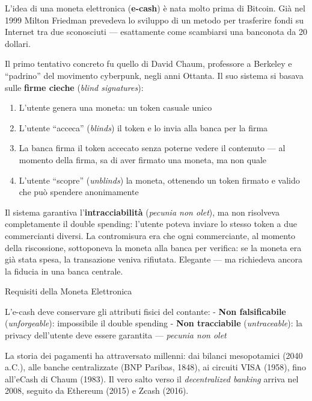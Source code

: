 \documentclass[
  italian,
  openany]{book}
\providecommand{\tightlist}{%
  \setlength{\itemsep}{0pt}\setlength{\parskip}{0pt}}
\begin{document}
L'idea di una moneta elettronica (\textbf{e-cash}) è nata molto prima di
Bitcoin. Già nel 1999 Milton Friedman prevedeva lo sviluppo di un metodo
per trasferire fondi su Internet tra due sconosciuti --- esattamente
come scambiarsi una banconota da 20 dollari.

Il primo tentativo concreto fu quello di David Chaum, professore a
Berkeley e ``padrino'' del movimento cyberpunk, negli anni Ottanta. Il
suo sistema si basava sulle \textbf{firme cieche} (\emph{blind
signatures}):

\begin{enumerate}
\def\labelenumi{\arabic{enumi}.}
\tightlist
\item
  L'utente genera una moneta: un token casuale unico
\item
  L'utente ``acceca'' (\emph{blinds}) il token e lo invia alla banca per
  la firma
\item
  La banca firma il token accecato senza poterne vedere il contenuto ---
  al momento della firma, sa di aver firmato una moneta, ma non quale
\item
  L'utente ``scopre'' (\emph{unblinds}) la moneta, ottenendo un token
  firmato e valido che può spendere anonimamente
\end{enumerate}

Il sistema garantiva l'\textbf{intracciabilità} (\emph{pecunia non
olet}), ma non risolveva completamente il double spending: l'utente
poteva inviare lo stesso token a due commercianti diversi. La
contromisura era che ogni commerciante, al momento della riscossione,
sottoponeva la moneta alla banca per verifica: se la moneta era già
stata spesa, la transazione veniva rifiutata. Elegante --- ma richiedeva
ancora la fiducia in una banca centrale.

\begin{calloutdefinition}{Requisiti della Moneta Elettronica}

L'e-cash deve conservare gli attributi fisici del contante: -
\textbf{Non falsificabile} (\emph{unforgeable}): impossibile il double
spending - \textbf{Non tracciabile} (\emph{untraceable}): la privacy
dell'utente deve essere garantita --- \emph{pecunia non olet}

\end{calloutdefinition}

La storia dei pagamenti ha attraversato millenni: dai bilanci
mesopotamici (2040 a.C.), alle banche centralizzate (BNP Paribas, 1848),
ai circuiti VISA (1958), fino all'eCash di Chaum (1983). Il vero salto
verso il \emph{decentralized banking} arriva nel 2008, seguito da
Ethereum (2015) e Zcash (2016).
\end{document}
